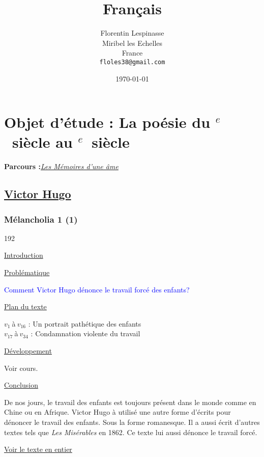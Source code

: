 \documentclass[12pt,a4paper]{article}
\title{Fran\c cais}
\author{Florentin Lespinasse\\
	Miribel les Echelles\\
	France\\
	   \texttt{floles38@gmail.com}}
\date{\today}
\begin{document}
\begin{center}
\setcounter{tocdepth}{4}								%
\renewcommand{\contentsname}{Sommaire}					%
\newpage
\tableofcontents										%
\end{center}
\newpage
		\section[Les M\'emoires d'une \^ame]{Objet d'\'etude : La po\'esie du \textsc{}$^{e}$~siècle au \textsc{}$^{e}$~siècle}
		\textbf{Parcours :}\textit{\underline{Les M\'emoires d'une \^ame}}
			\subsection{\href{.extra/Bio/Hugo.pdf}{Victor Hugo}}
				\subsubsection{M\'elancholia 1 (1) }
\begin{dingautolist}{192}

\item \underline{Introduction} \par


\item \underline{Probl\'ematique }\par
	\textcolor{blue}{Comment Victor Hugo d\'enonce le travail forc\'e des enfants?}
\item \underline{Plan du texte} \par
		$v_{1}~$\`a$~v_{16}$ : Un portrait path\'etique des enfants\\
        $v_{17}~$\`a$~v_{34}$ : Condamnation violente du travail 
	

\item \underline{D\'eveloppement} \par
	Voir cours.

\item \underline{Conclusion} \par
	De nos jours, le travail des enfants est toujours pr\'esent dans le monde comme en Chine ou en Afrique. Victor Hugo \`a utilis\'e une autre forme d'\'ecrits pour d\'enoncer le travail des enfants. Sous la forme romanesque. Il a aussi \'ecrit d'autres textes tels que \textit{Les Mis\'erables} en 1862. Ce texte lui aussi d\'enonce le travail forc\'e.
\end{dingautolist}
\href{.extra/Textes/Melancholia.pdf}{Voir le texte en entier}
 \newpage
\end{document}
